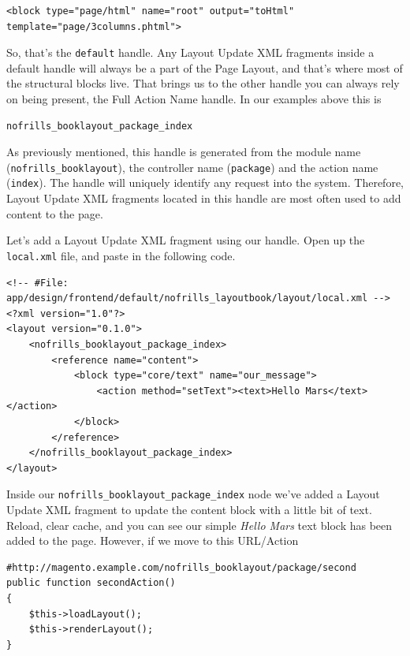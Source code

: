 \documentclass[oneside]{book}
\begin{document}
\begin{lstlisting}
<block type="page/html" name="root" output="toHtml"
template="page/3columns.phtml">

\end{lstlisting}


So, that's the \footnotesize\texttt{default} \normalsize  handle.  Any Layout Update XML fragments inside a default handle will always be a part of the Page Layout, and that's where most of the structural blocks live.  That brings us to the other handle you can always rely on being present, the Full Action Name handle.  In our examples above this is

\begin{lstlisting}
nofrills_booklayout_package_index

\end{lstlisting}


As previously mentioned, this handle is generated from the module name (\footnotesize\texttt{nofrills\_booklayout}\normalsize), the controller name (\footnotesize\texttt{package}\normalsize) and the action name (\footnotesize\texttt{index}\normalsize).  The handle will uniquely identify any request into the system.  Therefore, Layout Update XML fragments located in this handle are most often used to add content to the page.

Let's add a Layout Update XML fragment using our handle.  Open up the \footnotesize\texttt{local.xml} \normalsize  file, and paste in the following code.

\begin{lstlisting}
<!-- #File: app/design/frontend/default/nofrills_layoutbook/layout/local.xml -->
<?xml version="1.0"?>
<layout version="0.1.0">
    <nofrills_booklayout_package_index>
        <reference name="content">
            <block type="core/text" name="our_message">
                <action method="setText"><text>Hello Mars</text></action>
            </block>
        </reference>
    </nofrills_booklayout_package_index>
</layout>

\end{lstlisting}


Inside our \footnotesize\texttt{nofrills\_booklayout\_package\_index} \normalsize  node we've added a Layout Update XML fragment to update the content block with a little bit of text.  Reload, clear cache, and you can see our simple \emph{Hello Mars} text block has been added to the page.  However, if we move to this URL/Action

\begin{lstlisting}
#http://magento.example.com/nofrills_booklayout/package/second
public function secondAction()
{
    $this->loadLayout();
    $this->renderLayout();
}

\end{lstlisting}
\end{document}
